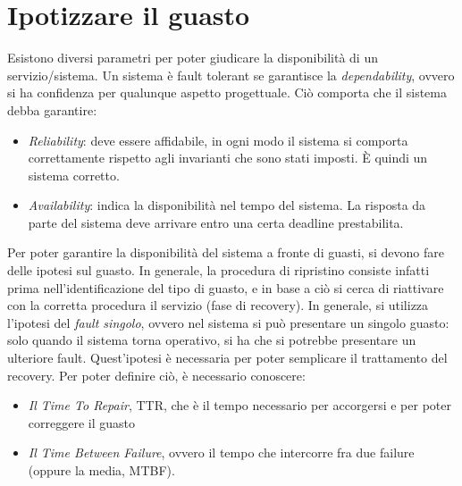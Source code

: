 \section{Ipotizzare il guasto}
Esistono diversi parametri per poter giudicare la disponibilità di un 
servizio/sistema.
Un sistema è fault tolerant se garantisce la \textit{dependability}, ovvero si 
ha confidenza per qualunque aspetto
progettuale. Ciò comporta che il sistema debba garantire:
\begin{itemize}
 \item \textit{Reliability}: deve essere affidabile, in ogni modo il sistema si 
comporta correttamente rispetto agli
invarianti che sono stati imposti. È quindi un sistema corretto.
 \item \textit{Availability}: indica la disponibilità nel tempo del sistema. La 
risposta da parte del sistema deve
arrivare entro una certa deadline prestabilita.
\end{itemize}
Per poter garantire la disponibilità del sistema a fronte di guasti, si devono 
fare delle ipotesi sul guasto. In
generale, la procedura di ripristino consiste infatti prima 
nell'identificazione del tipo di guasto, e in base a ciò si
cerca di riattivare con la corretta procedura il servizio (fase di recovery).
In generale, si utilizza l'ipotesi del \textit{fault singolo}, ovvero nel 
sistema si può presentare un singolo guasto:
solo quando il sistema torna operativo, si ha che si potrebbe presentare un 
ulteriore fault. Quest'ipotesi è necessaria
per poter semplicare il trattamento del recovery. Per poter definire ciò, è 
necessario conoscere:
\begin{itemize}
 \item \textit{Il Time To Repair}, TTR, che è il tempo necessario per 
accorgersi e per poter correggere il guasto
 \item \textit{Il Time Between Failure}, ovvero il tempo che intercorre fra due 
failure (oppure la media, MTBF).
\end{itemize}

